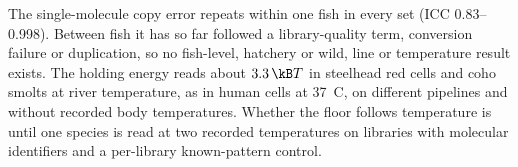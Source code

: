 \begin{keybox}[title=What the fish showed]
The single-molecule copy error repeats within one fish in every set (ICC 0.83--0.998). Between fish it has so far followed a
library-quality term, conversion failure or duplication, so no fish-level, hatchery or wild, line or temperature result exists.
\measured{} The holding energy reads about $3.3\,\kB T$ in steelhead red cells and coho smolts at river temperature, as in human
cells at 37~\textdegree C, on different pipelines and without recorded body temperatures. \measured{} Whether the floor follows
temperature is \openprob{} until one species is read at two recorded temperatures on libraries with molecular identifiers and a
per-library known-pattern control.
\end{keybox}
